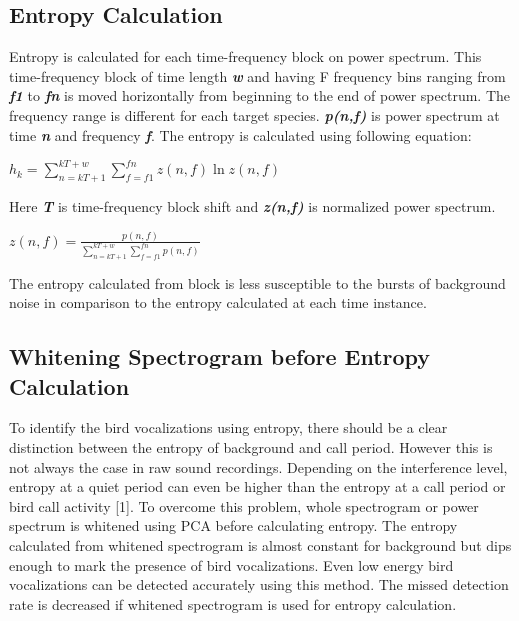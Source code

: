 \documentclass[a4paper]{article}
\begin{document}
\subsection{Entropy Calculation}
Entropy is calculated for each time-frequency block on power spectrum. This time-frequency block of time length \textbf{\textit{w}} and having F frequency bins ranging from \textbf{\textit{f1}} to  \textbf{\textit{fn}} is moved horizontally from beginning to the end of power spectrum. The frequency range is different for each target species. \textbf{\textit{p(n,f)}} is power spectrum at time \textbf{\textit{n}} and frequency  \textbf{\textit{f}}. The entropy is calculated using following equation:

\hspace{1cm}

  $h_{k}=\sum_{n=kT+1}^{kT+w}\sum_{f=f1}^{fn}z(n,f) \ln z(n,f)$

 \hspace{1cm}
 
Here \textbf{\textit{T}} is time-frequency block shift and \textbf{\textit{z(n,f)}} is normalized power spectrum.


\hspace{1cm}

$z(n,f)=\frac {p(n,f)}
{\sum_{n=kT+1}^{kT+w}\sum_{f=f1}^{fn} p(n,f)}$

\hspace{1cm}


The entropy calculated from block is less susceptible to the bursts of background noise in comparison to the entropy calculated at each time instance. 


\subsection{Whitening Spectrogram before Entropy Calculation}

To identify the bird vocalizations using entropy, there should be a clear distinction between the entropy of background and call period. However this is not always the case in raw sound recordings. Depending on the interference level, entropy at a quiet period can even be higher than the entropy at a call period or bird call activity [1]. To overcome this problem, whole spectrogram or power spectrum is whitened using PCA  before calculating entropy. The entropy calculated from whitened spectrogram is almost constant for background but dips enough to mark the presence of bird vocalizations. Even low energy bird vocalizations can be detected accurately using this method. The missed detection rate is decreased if whitened spectrogram is used for entropy calculation. 
\end{document}
